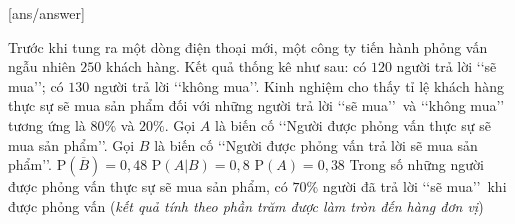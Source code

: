 
\cauds

[ans/answer]
\begin{ex}%
	Trước khi tung ra một dòng điện thoại mới, một công ty tiến hành phỏng vấn ngẫu nhiên $250$ khách hàng. Kết quả thống kê như sau: có $120$ người trả lời \lq\lq sẽ mua\rq\rq; có $130$ người trả lời \lq\lq không mua\rq\rq. Kinh nghiệm cho thấy tỉ lệ khách hàng thực sự sẽ mua sản phẩm đối với những người trả lời \lq\lq sẽ mua\rq\rq \, và \lq\lq không mua\rq\rq \, tương ứng là $80\%$ và $20\%$.
	Gọi $A$ là biến cố \lq\lq Người được phỏng vấn thực sự sẽ mua sản phẩm\rq\rq.
	Gọi $B$ là biến cố \lq\lq Người được phỏng vấn trả lời sẽ mua sản phẩm\rq\rq.
	\choiceTF
	{$\mathrm{P}(\overline{B})=0{,}48$}
	{\True $\mathrm{P}(A|B)=0{,}8$}
	{$\mathrm{P}(A)=0{,}38$}
	{Trong số những người được phỏng vấn thực sự sẽ mua sản phẩm, có $70\%$ người đã trả lời \lq\lq sẽ mua\rq\rq \, khi được phỏng vấn (\textit{kết quả tính theo phần trăm được làm tròn đến hàng đơn vị})}
\end{ex}

